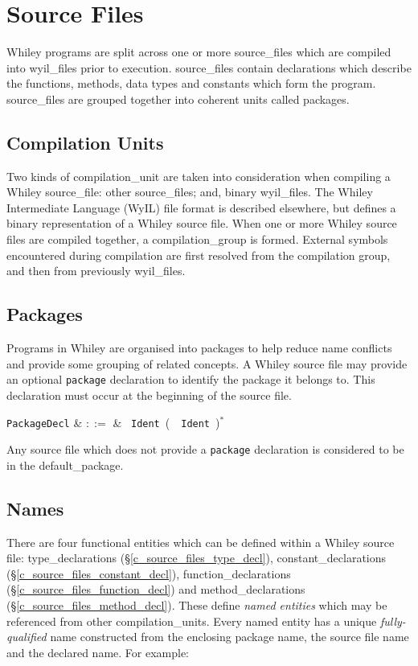 \chapter{Source Files}
\label{c_source_files}
Whiley programs are split across one or more \gls{source_file}s which
are compiled into \gls{wyil_file}s prior to execution.
\Gls{source_file}s contain declarations which describe the functions,
methods, data types and constants which form the program.
\Gls{source_file}s are grouped together into coherent units called
\gls{package}s.


\section{Compilation Units}
\label{c_source_files_compilation_units}
Two kinds of \gls{compilation_unit} are taken into consideration when compiling a Whiley \gls{source_file}: other \gls{source_file}s; and, binary \gls{wyil_file}s.  The Whiley Intermediate Language (WyIL) file format is described elsewhere, but defines a binary representation of a Whiley source file.  When one or more Whiley source files are compiled together, a \gls{compilation_group} is formed.  External symbols encountered during compilation are first resolved from the compilation group, and then from previously \gls{wyil_file}s.

\section{Packages}
\label{c_source_files_packages}

Programs in Whiley are organised into \gls{package}s to help reduce name conflicts and provide some grouping of related concepts.  A Whiley source file may provide an optional \lstinline{package} declaration to identify the package it belongs to.  This declaration must occur at the beginning of the source file.

\begin{syntax}
\verb+PackageDecl+ & $::=$ & \ \verb+Ident+\ \big(\ \ \verb+Ident+\ \big)$^*$\\
\end{syntax}

Any source file which does not provide a \lstinline{package} declaration is considered to be in the \gls{default_package}.

\section{Names}
\label{c_source_files_names}
There are four functional entities which can be defined within a Whiley source file: \gls{type_declaration}s (\S\ref{c_source_files_type_decl}), \gls{constant_declaration}s (\S\ref{c_source_files_constant_decl}), \gls{function_declaration}s (\S\ref{c_source_files_function_decl}) and \gls{method_declaration}s (\S\ref{c_source_files_method_decl}).  These define {\em named entities} which may be referenced from other \gls{compilation_unit}s.  Every named entity has a unique {\em fully-qualified} name constructed from the enclosing package name, the source file name and the declared name.  For example:\\

